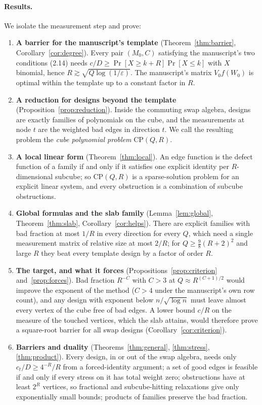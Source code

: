 \documentclass[11pt]{article}
\theoremstyle{definition}
\theoremstyle{remark}
\newcommand{\CP}{\mathrm{CP}}
\begin{document}
\paragraph{Results.} We isolate the measurement step and prove:
\begin{enumerate}[leftmargin=2em]
\item \textbf{A barrier for the manuscript's template} (Theorem~\ref{thm:barrier}, Corollary~\ref{cor:degree}). Every pair $(M_0,C)$ satisfying the manuscript's two conditions (2.14) needs $c/D\ge\Pr[X\ge k+R]\Pr[X\le k]$ with $X$ binomial, hence $R\gtrsim\sqrt{Q\log(1/\varepsilon)}$. The manuscript's matrix $V_0f(W_0)$ is optimal within the template up to a constant factor in $R$.
\item \textbf{A reduction for designs beyond the template} (Proposition~\ref{prop:reduction}). Inside the commuting swap algebra, designs are exactly families of polynomials on the cube, and the measurements at node $t$ are the weighted bad edges in direction $t$. We call the resulting problem the \emph{cube polynomial problem} $\CP(Q,R)$.
\item \textbf{A local linear form} (Theorem~\ref{thm:local}). An edge function is the defect function of a family if and only if it satisfies one explicit identity per $R$-dimensional subcube; so $\CP(Q,R)$ is a sparse-solution problem for an explicit linear system, and every obstruction is a combination of subcube obstructions.
\item \textbf{Global formulas and the slab family} (Lemma~\ref{lem:global}, Theorem~\ref{thm:slab}, Corollary~\ref{cor:helps}). There are explicit families with bad fraction at most $1/R$ in every direction for every $Q$, which need a single measurement matrix of relative size at most $2/R$; for $Q\ge\frac98(R+2)^2$ and large $R$ they beat every template design by a factor of order $R$.
\item \textbf{The target, and what it forces} (Propositions~\ref{prop:criterion} and~\ref{prop:forces}). Bad fraction $R^{-C}$ with $C>3$ at $Q\approx R^{(C+1)/2}$ would improve the exponent of the method ($C>4$ under the manuscript's own row count), and any design with exponent below $n/\sqrt{\log n}$ must leave almost every vertex of the cube free of bad edges. A lower bound $c/R$ on the measure of the touched vertices, which the slab attains, would therefore prove a square-root barrier for all swap designs (Corollary~\ref{cor:criterion}).
\item \textbf{Barriers and duality} (Theorems~\ref{thm:general}, \ref{thm:stress}, \ref{thm:product}). Every design, in or out of the swap algebra, needs only $c_t/D\ge4^{-R}/R$ from a forced-identity argument; a set of good edges is feasible if and only if every stress on it has total weight zero; obstructions have at least $2^R$ vertices, so fractional and subcube-hitting relaxations give only exponentially small bounds; products of families preserve the bad fraction.
\end{enumerate}
\end{document}
